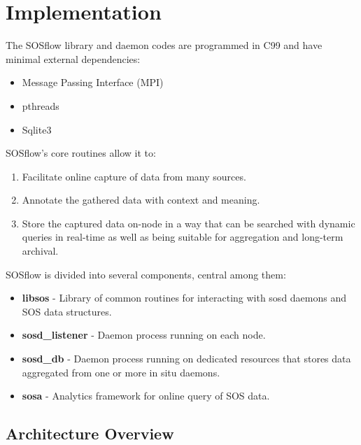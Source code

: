\section{Implementation}
%
The SOSflow library and daemon codes are programmed in C99 and have
minimal external dependencies:
%
\begin{itemize}
    \item Message Passing Interface (MPI)
    \item pthreads
    \item Sqlite3
\end{itemize}
%
SOSflow's core routines allow it to:
%
\begin{enumerate}
    \item Facilitate online capture of data from many sources.
    \item Annotate the gathered data with context and meaning.
    \item Store the captured data on-node in a way that can be
      searched with dynamic queries in real-time as well as being
      suitable for aggregation and long-term archival.
\end{enumerate}
%
%
SOSflow is divided into several components, central among them:
%
\begin{itemize}
    \item \textbf{libsos} - Library of common routines for interacting with
      sosd daemons and SOS data structures.
    \item \textbf{sosd\_listener} - Daemon process running on each node.
    \item \textbf{sosd\_db} - Daemon process running on dedicated resources
      that stores data aggregated from one or more in situ daemons.
    \item \textbf{sosa} - Analytics framework for online query of SOS data.
\end{itemize}

\subsection{Architecture Overview} %


